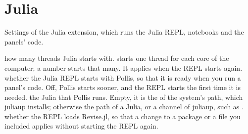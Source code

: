 \section{Julia}\label{sec:julia}
Settings of the Julia extension, which runs the Julia REPL, notebooks and the panels' code.
\begin{itemize}
    how many threads Julia starts with.  starts one thread for each core of the computer; a number starts
    that many. It applies when the REPL starts again.
    whether the Julia REPL starts with Pollis, so that it is ready when you run a panel's code. Off, Pollis starts
    sooner, and the REPL starts the first time it is needed.
    the Julia that Pollis runs. Empty, it is the  of the system's path, which juliaup installs; otherwise
    the path of a Julia, or a channel of juliaup, such as .
    whether the REPL loads Revise.jl, so that a change to a package or a file you included applies without starting
    the REPL again.
\end{itemize}

